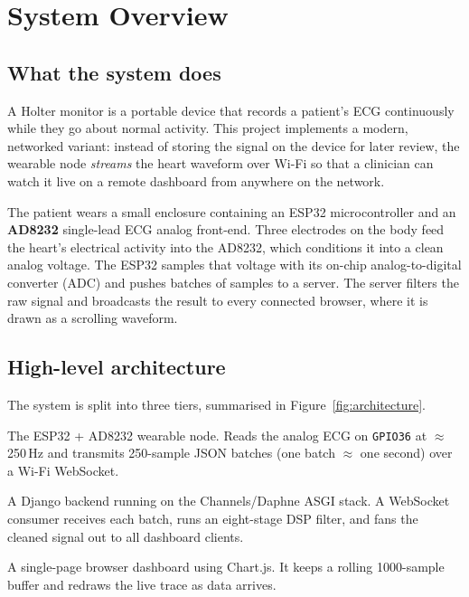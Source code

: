 \section{System Overview}

\subsection{What the system does}
A Holter monitor is a portable device that records a patient's ECG continuously
while they go about normal activity. This project implements a modern, networked
variant: instead of storing the signal on the device for later review, the
wearable node \emph{streams} the heart waveform over Wi-Fi so that a clinician
can watch it live on a remote dashboard from anywhere on the network.

The patient wears a small enclosure containing an ESP32 microcontroller and an
\textbf{AD8232} single-lead ECG analog front-end. Three electrodes on the body
feed the heart's electrical activity into the AD8232, which conditions it into a
clean analog voltage. The ESP32 samples that voltage with its on-chip
analog-to-digital converter (ADC) and pushes batches of samples to a server. The
server filters the raw signal and broadcasts the result to every connected
browser, where it is drawn as a scrolling waveform.

\subsection{High-level architecture}
The system is split into three tiers, summarised in
Figure~\ref{fig:architecture}.

\begin{description}[leftmargin=2.2cm,style=nextline]
  \item[Acquisition] The ESP32 + AD8232 wearable node. Reads the analog ECG on
        \texttt{GPIO36} at $\approx$\,250\,Hz and transmits 250-sample JSON
        batches (one batch $\approx$ one second) over a Wi-Fi WebSocket.
  \item[Processing] A Django backend running on the Channels/Daphne ASGI stack.
        A WebSocket consumer receives each batch, runs an eight-stage DSP filter,
        and fans the cleaned signal out to all dashboard clients.
  \item[Visualisation] A single-page browser dashboard using Chart.js. It keeps a
        rolling 1000-sample buffer and redraws the live trace as data arrives.
\end{description}

